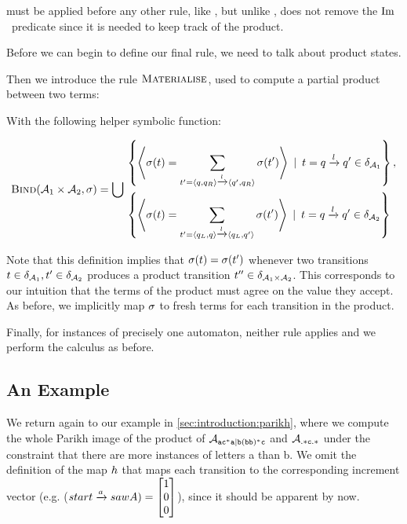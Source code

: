 \documentclass[acmsmall,review,anonymous,screen]{acmart}\settopmatter{printfolios=true,printccs=false,printacmref=true}
\theoremstyle{definition}
\begin{document}
\ExpandM{} must be applied before any other rule, like \Expand{}, but unlike \Expand{}, \ExpandM{} does not remove the $\operatorname{Im}$~predicate since it is needed to keep track of the product.

Before we can begin to define our final rule, we need to talk about product states.

Then we introduce the rule $\textsc{Materialise}$, used to compute a partial product between two terms:

  With the following helper symbolic function:

  $$
  \textsc{Bind}(\mathcal{A}_1 \times \mathcal{A}_2, \operatorname{\sigma}) = \bigcup
  \begin{aligned}
  & \left\{ 
    \left<\operatorname{\sigma}(t)  =  \sum\limits_{t' = \left\langle q, q_R\right\rangle \xrightarrow{l} \left\langle q', q_R\right\rangle} \operatorname{\sigma}(t')\right>
  \:\mid\: t = q \xrightarrow{l} q' \in \delta_{\mathcal{A}_1} \right\} , \\ 
  & \left\{
    \left<\operatorname{\sigma}(t)  =  \sum\limits_{t' = \left\langle q_L, q\right\rangle \xrightarrow{l} \left\langle q_L, q'\right\rangle} \operatorname{\sigma}(t')\right> \:\mid\: t = q \xrightarrow{l} q' \in \delta_{\mathcal{A}_2}
  \right\}
  \end{aligned}
$$

Note that this definition implies that $\operatorname{\sigma}(t) =
\operatorname{\sigma}(t')$ whenever two transitions $t \in
\delta_{\mathcal{A}_1}, t' \in \delta_{\mathcal{A}_2}$
produces a product transition $t'' \in \delta_{\mathcal{A}_1
\times \mathcal{A}_2}$. This corresponds to our intuition that the terms of the
product must agree on the value they accept. As before, we implicitly map
$\operatorname{\sigma}$ to fresh terms for each transition in the product.

Finally, for instances of precisely one automaton, neither rule applies and we
perform the calculus as before.

\subsection{An Example}\label{sec:multiple:example}

We return again to our example in \cref{sec:introduction:parikh}, where we
compute the whole Parikh image of the product of $\mathcal{A}_{\mathtt{ac^*a|b(bb)^*c}}{}$ and
$\mathcal{A}_{\mathtt{.*c.*}}$ under the constraint that there are more instances of
letters a than b. We omit the definition of the map $h$ that maps each
transition to the corresponding increment vector (e.g.
\Map($start \xrightarrow{a} sawA) = \begin{bmatrix}1\\0\\0\end{bmatrix}$),
since it should be apparent by now.
\end{document}
